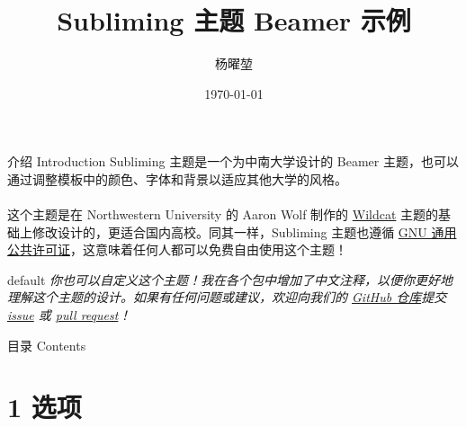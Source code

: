 \documentclass[10pt,aspectratio=169,fontset=none]{ctexbeamer}
\title{Subliming 主题 Beamer 示例}
\author{杨曜堃}
\institute{地球科学与信息物理学院}
\date{\today}
\begin{document}
    \begin{frame}
        \titlepage
    \end{frame}

    \begin{frame}{介绍 Introduction}
        Subliming 主题是一个为中南大学设计的 Beamer 主题，也可以通过调整模板中的颜色、字体和背景以适应其他大学的风格。 
        \\ ~ \\
        这个主题是在 Northwestern University 的 Aaron Wolf 制作的 \href{https://github.com/aarondwolf/wildcatwildcat}{Wildcat} 主题的基础上修改设计的，更适合国内高校。同其一样，Subliming 主题也遵循 \href{http://www.gnu.org/licenses/}{GNU 通用公共许可证}，这意味着任何人都可以免费自由使用这个主题！
        
        \begin{tbox}{default}
            \textit{你也可以自定义这个主题！我在各个包中增加了中文注释，以便你更好地理解这个主题的设计。如果有任何问题或建议，欢迎向我们的 \href{https://github.com/PourRevenir/Subliming}{GitHub 仓库}提交 \href{https://github.com/PourRevenir/Subliming/issues}{issue} 或 \href{https://github.com/PourRevenir/Subliming/pulls}{pull request}！}
        \end{tbox}
    \end{frame}

    \begin{frame}{目录 Contents}
        \large\tableofcontents
    \end{frame}

    \section{1 选项}
\end{document}

